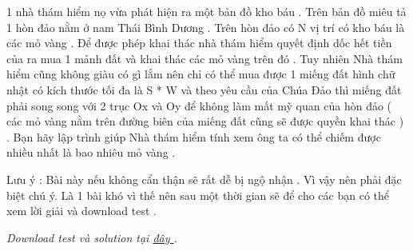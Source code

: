 1 nhà thám hiểm nọ vừa phát hiện ra một bản đồ kho báu . Trên bản đồ miêu tả 1 hòn đảo  nằm ở nam Thái Bình Dương . Trên hòn đảo có N vị trí có kho báu là các mỏ vàng . Để được phép khai thác nhà thám hiểm quyết định dốc hết tiền của ra mua 1 mảnh đất và khai thác các mỏ vàng trên đó . Tuy nhiên Nhà thám hiểm cũng không giàu có gì lắm nên chỉ có thể mua được 1 miếng đất hình chữ nhật có kích thước tối đa là S * W và theo yêu cầu của Chúa Đảo thì miếng đất phải song song với 2 trục Ox và Oy để không làm mất mỹ quan của hòn đảo ( các mỏ vàng nằm trên đường biên của miếng đất cũng sẽ được quyền khai thác ) . Bạn hãy lập trình giúp Nhà thám hiểm tính xem ông ta có thể chiếm được nhiều nhất là bao nhiêu mỏ vàng .   


       Lưu ý : Bài này nếu không cẩn thận sẽ rất dễ bị ngộ nhận . Vì vậy nên phải đặc biệt chú ý. Là 1 bài khó vì thế nên sau một thời gian sẽ để cho các bạn có thể xem lời giải và download test .      





\textit{    Download test và solution tại    \href{http://vn.spoj.pl/content/GOLD.rar}{     đây    }    .   }